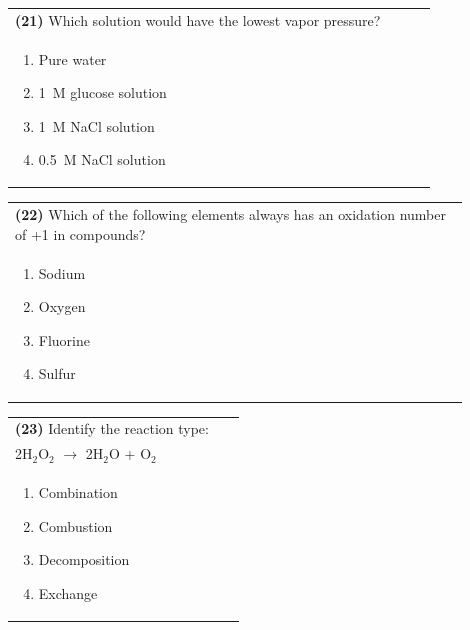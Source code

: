 \documentclass{article}
\begin{document}
\noindent\begin{tabular}{|p{0.9\linewidth}|}
\hline
\textbf{(21)} Which solution would have the lowest vapor pressure?\\[0.2cm]
\begin{minipage}[t]{0.85\linewidth}
\begin{enumerate}[label=\alph*.]
\item Pure water
\item 1~M glucose solution
\item 1~M NaCl solution
\item 0.5~M NaCl solution
\end{enumerate}
\end{minipage}\\[0.2cm]
\hline
\end{tabular}

\noindent\begin{tabular}{|p{0.9\linewidth}|}
\hline
\textbf{(22)} Which of the following elements always has an oxidation number of +1 in compounds?\\[0.2cm]
\begin{minipage}[t]{0.85\linewidth}
\begin{enumerate}[label=\alph*.]
\item Sodium
\item Oxygen
\item Fluorine
\item Sulfur
\end{enumerate}
\end{minipage}\\[0.2cm]
\hline
\end{tabular}

\noindent\begin{tabular}{|p{0.9\linewidth}|}
\hline
\textbf{(23)} Identify the reaction type:\\[0.2cm]
2H$_2$O$_2$ $\rightarrow$ 2H$_2$O + O$_2$\\[0.2cm]
\begin{minipage}[t]{0.85\linewidth}
\begin{enumerate}[label=\alph*.]
\item Combination
\item Combustion
\item Decomposition
\item Exchange
\end{enumerate}
\end{minipage}\\[0.2cm]
\hline
\end{tabular}
\end{document}
